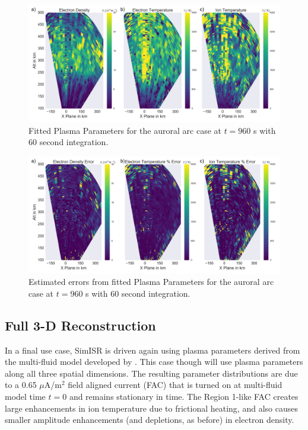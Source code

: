 \documentclass[draft,ras]{agutex}
\begin{document}
\begin{article}

\begin{figure}[!t]
\centering
\includegraphics[width=6in]{0960_60_int}
\caption{Fitted Plasma Parameters for the auroral arc case at $t=960$ s with 60 second integration.}
\label{fig:fplparamst60}
\end{figure}

\begin{figure}[!t]
\centering
\includegraphics[width=6in]{0960_60_int_err}
\caption{Estimated errors from fitted Plasma Parameters for the auroral arc case at $t=960$ s with 60 second integration.}
\label{fig:fplparamst60err}
\end{figure}

\subsection{Full 3-D Reconstruction}

In a final use case, SimISR is driven again using plasma parameters derived from the multi-fluid model developed by \cite{semeter:plasmatransport2012}. This case though will use plasma parameters along all three spatial dimensions. The resulting parameter distributions are due to a 0.65 $\mu$A/m$^2$ field aligned current (FAC) that is turned on at multi-fluid model time $t=0$ and remains stationary in time. The Region 1-like FAC creates large enhancements in ion temperature due to frictional heating, and also causes smaller amplitude enhancements (and depletions, as before) in electron density.


\end{article}
\end{document}
